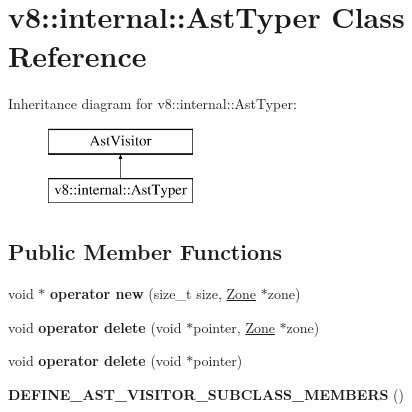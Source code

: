 \hypertarget{classv8_1_1internal_1_1_ast_typer}{}\section{v8\+:\+:internal\+:\+:Ast\+Typer Class Reference}
\label{classv8_1_1internal_1_1_ast_typer}
Inheritance diagram for v8\+:\+:internal\+:\+:Ast\+Typer\+:\begin{figure}[H]
\begin{center}
\leavevmode
\includegraphics[height=2.000000cm]{classv8_1_1internal_1_1_ast_typer}
\end{center}
\end{figure}
\subsection*{Public Member Functions}
\begin{DoxyCompactItemize}
\item 
\hypertarget{classv8_1_1internal_1_1_ast_typer_ad459e1e5801cf414325cb1e35613ba14}{}void $\ast$ {\bfseries operator new} (size\+\_\+t size, \hyperlink{classv8_1_1internal_1_1_zone}{Zone} $\ast$zone)\label{classv8_1_1internal_1_1_ast_typer_ad459e1e5801cf414325cb1e35613ba14}

\item 
\hypertarget{classv8_1_1internal_1_1_ast_typer_af065f25a66647fac4827b0bede816afb}{}void {\bfseries operator delete} (void $\ast$pointer, \hyperlink{classv8_1_1internal_1_1_zone}{Zone} $\ast$zone)\label{classv8_1_1internal_1_1_ast_typer_af065f25a66647fac4827b0bede816afb}

\item 
\hypertarget{classv8_1_1internal_1_1_ast_typer_a63a58bc443b7927d52831ee95edf0fdb}{}void {\bfseries operator delete} (void $\ast$pointer)\label{classv8_1_1internal_1_1_ast_typer_a63a58bc443b7927d52831ee95edf0fdb}

\item 
\hypertarget{classv8_1_1internal_1_1_ast_typer_a911921c74252f2efa0cc6c0120706767}{}{\bfseries D\+E\+F\+I\+N\+E\+\_\+\+A\+S\+T\+\_\+\+V\+I\+S\+I\+T\+O\+R\+\_\+\+S\+U\+B\+C\+L\+A\+S\+S\+\_\+\+M\+E\+M\+B\+E\+R\+S} ()\label{classv8_1_1internal_1_1_ast_typer_a911921c74252f2efa0cc6c0120706767}

\end{DoxyCompactItemize}
